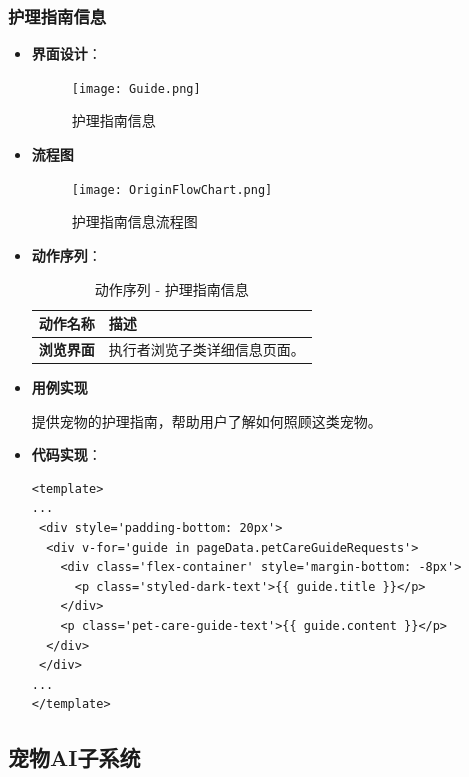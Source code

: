 \subsubsection{护理指南信息}

\begin{itemize}
	\item \textbf{界面设计}：
	\begin{figure}[H]
		\centering
		\texttt{[image: Guide.png]}
		\caption{护理指南信息}
		\label{护理指南信息}
	\end{figure}
	
	\item \textbf{流程图}
	
	\begin{figure}[H]
		\centering
		\texttt{[image: OriginFlowChart.png]}
		\caption{护理指南信息流程图}
		\label{护理指南信息流程图}
	\end{figure}
	
	\item \textbf{动作序列}：
	\begin{table}[H]
		\centering
		\caption{动作序列 - 护理指南信息}
		\renewcommand\arraystretch{1.5}
		\begin{tabular}{|c|>{\raggedright\arraybackslash}p{10cm}|}
			\hline
			\textbf{动作名称} & \textbf{描述} \\ \hline
			\textbf{浏览界面} & 执行者浏览子类详细信息页面。\\ \hline
		\end{tabular}
	\end{table}
	
	\item \textbf{用例实现}
	
	提供宠物的护理指南，帮助用户了解如何照顾这类宠物。
	\item \textbf{代码实现}：
	\begin{verbatim}
<template>
...
 <div style='padding-bottom: 20px'>
  <div v-for='guide in pageData.petCareGuideRequests'>
    <div class='flex-container' style='margin-bottom: -8px'>
      <p class='styled-dark-text'>{{ guide.title }}</p>
    </div>
    <p class='pet-care-guide-text'>{{ guide.content }}</p>
  </div>
 </div>
...
</template>
	\end{verbatim}
	
\end{itemize}

\subsection{宠物AI子系统}

